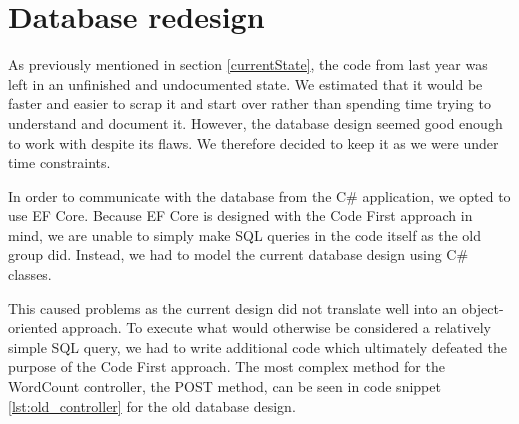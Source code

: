 \section{Database redesign}

As previously mentioned in section \ref{currentState}, the code from last year was left in an unfinished and undocumented state. We estimated that it would be faster and easier to scrap it and start over rather than spending time trying to understand and document it.
However, the database design seemed good enough to work with despite its flaws. 
We therefore decided to keep it as we were under time constraints.

In order to communicate with the database from the C\# application, we opted to use EF Core.
Because EF Core is designed with the Code First approach in mind, we are unable to simply make SQL queries in the code itself as the old group did. 
Instead, we had to model the current database design using C\# classes. 

This caused problems as the current design did not translate well into an object-oriented approach.
To execute what would otherwise be considered a relatively simple SQL query, we had to write additional code which ultimately defeated the purpose of the Code First approach. 
The most complex method for the WordCount controller, the POST method, can be seen in code snippet \ref{lst:old_controller} for the old database design.

